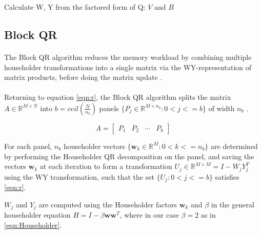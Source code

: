 \documentclass{article}
\begin{document}
\begin{algorithm}
\caption{Calculate W, Y from the factored form of Q: $V$ and $B$}
\label{wy}
\begin{algorithmic}[1]
\ENDFOR
\end{algorithmic}
\end{algorithm}



\subsection{Block QR}
\paragraph{}
 The Block QR algorithm reduces the memory workload by combining multiple householder transformations into a single matrix via the WY-representation of matrix products, before doing the matrix update \cite{BISCHOFC1987TWrf}.

\paragraph{}
Returning to equation \eqref{eqn:r}, the Block QR algorithm splits the matrix $A \in\mathbb{R}^{M\times{}N}$ into $b = ceil(\frac{N}{n_b})$ panels $\{P_j \in \mathbb{R}^{M\times{}n_b} : 0 < j <= b\}$ of width $n_b$ \cite{doi:10.1137/19M1296367}.

\begin{equation}
A = 
\begin{bmatrix}
P_1 & P_2 & \cdots & P_b
\end{bmatrix}
\end{equation}

For each panel, $n_b$ householder vectors $\{\mathbf{w}_k \in \mathbb{R}^M : 0 < k <= n_b\}$ are determined by performing the Householder QR decomposition on the panel, and saving the vectors $\mathbf{w}_k$ at each iteration to form a transformation $U_j \in \mathbb{R}^{M\times M} = I - W_jY_j^T$ using the WY transformation, such that the set $\{U_j : 0 < j <= b\}$ satisfies \eqref{eqn:r}.

$W_j$ and $Y_j$ are computed using the Householder factors $\mathbf{w}_k$ and $\beta{}$ in the general householder equation $H = I - \beta{}\mathbf{w}\mathbf{w}^T$, where in our case $\beta = 2$ as in \eqref{eqn:Householder}.
\end{document}

